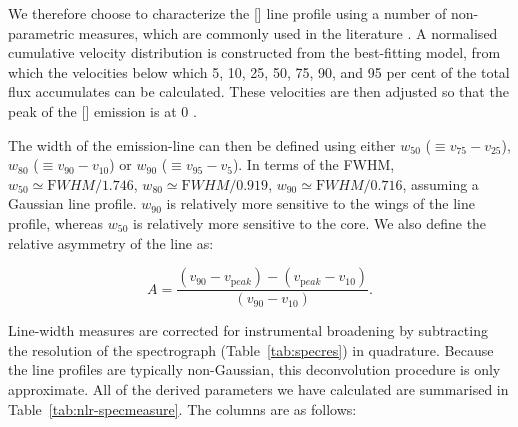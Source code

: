 We therefore choose to characterize the [] line profile using a number of non-parametric measures, which are commonly used in the literature \citep[e.g.][]{zakamska14,zakamska16}. 
A normalised cumulative velocity distribution is constructed from the best-fitting model, from which the velocities below which 5, 10, 25, 50, 75, 90, and 95 per cent of the total flux accumulates can be calculated. 
These velocities are then adjusted so that the peak of the [] emission is at 0 \kms. 

The width of the emission-line can then be defined using either $w_{50}$ ($\equiv v_{75} - v_{25}$), $w_{80}$ ($\equiv v_{90} - v_{10}$) or $w_{90}$ ($\equiv v_{95} - v_{5}$). 
In terms of the FWHM, $w_{50} \simeq {\mathrm FWHM} / 1.746$, $w_{80} \simeq {\mathrm FWHM} / 0.919$, $w_{90} \simeq {\mathrm FWHM} / 0.716$, assuming a Gaussian line profile.  
$w_{90}$ is relatively more sensitive to the wings of the line profile, whereas $w_{50}$ is relatively more sensitive to the core.
We also define the relative asymmetry of the line as:

\begin{equation}
  A = \frac{(v_{90} - v_{\mathrm peak}) - (v_{\mathrm peak} - v_{10})}{(v_{90} - v_{10})}.     
\end{equation} 

Line-width measures are corrected for instrumental broadening by subtracting the resolution of the spectrograph (Table~\ref{tab:specres}) in quadrature.
Because the line profiles are typically non-Gaussian, this deconvolution procedure is only approximate. 
All of the derived parameters we have calculated are summarised in Table~\ref{tab:nlr-specmeasure}. 
The columns are as follows: 

